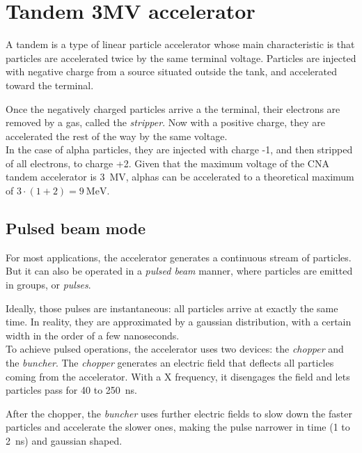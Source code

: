 \documentclass[a4paper,12pt]{report}
\begin{document}
\section{Tandem 3MV accelerator}
A tandem is a type of linear particle accelerator whose main characteristic is that particles are accelerated twice by the same terminal voltage.
Particles are injected with negative charge from a source situated outside the tank, and accelerated toward the terminal.

Once the negatively charged particles arrive a the terminal, their electrons are removed by a gas, called the \textit{stripper}.
Now with a positive charge, they are accelerated the rest of the way by the same voltage.
\\

In the case of alpha particles, they are injected with charge -1, and then stripped of all electrons, to charge +2.
Given that the maximum voltage of the CNA tandem accelerator is \qty{3}{\mega\volt}, alphas can be accelerated to a theoretical maximum of $3\cdot\left(1+2\right) = \qty{9}{\mega\eV}$.	%
\\

\subsection{Pulsed beam mode}
For most applications, the accelerator generates a continuous stream of particles.
But it can also be operated in a \textit{pulsed beam} manner, where particles are emitted in groups, or \textit{pulses}.

Ideally, those pulses are instantaneous: all particles arrive at exactly the same time.
In reality, they are approximated by a gaussian distribution, with a certain width in the order of a few nanoseconds.	%
\\

To achieve pulsed operations, the accelerator uses two devices: the \textit{chopper} and the \textit{buncher}.
The \textit{chopper} generates an electric field that deflects all particles coming from the accelerator.
With a X frequency, it disengages the field and lets particles pass for 40 to \qty{250}{\nano\second}.	%

After the chopper, the \textit{buncher} uses further electric fields to slow down the faster particles and accelerate the slower ones, making the pulse narrower in time (1 to \qty{2}{\nano\second}) and gaussian shaped.	%
\\
\end{document}
